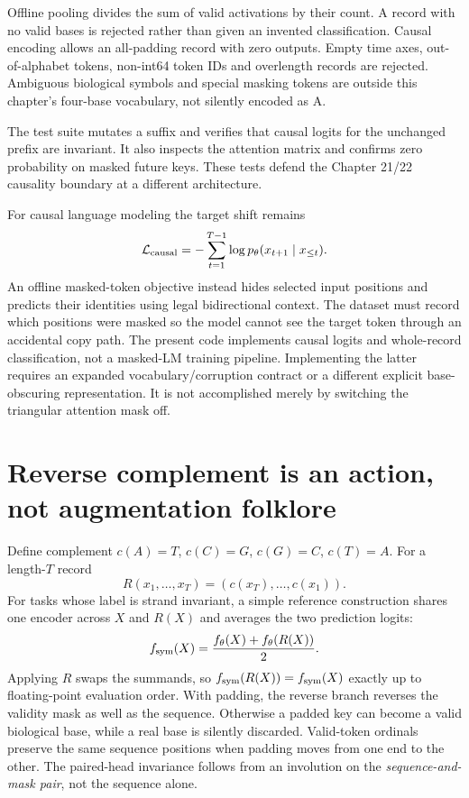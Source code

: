 Offline pooling divides the sum of valid activations by their count. A record
with no valid bases is rejected rather than given an invented classification.
Causal encoding allows an all-padding record with zero outputs. Empty time
axes, out-of-alphabet tokens, non-int64 token IDs and overlength records are
rejected. Ambiguous biological symbols and special masking tokens are outside
this chapter's four-base vocabulary, not silently encoded as A.


The test suite mutates a suffix and verifies that causal logits for the unchanged
prefix are invariant. It also inspects the attention matrix and confirms zero
probability on masked future keys. These tests defend the Chapter 21/22 causality
boundary at a different architecture.

For causal language modeling the target shift remains
\[
\mathcal L_{\rm causal}
=-\sum_{t=1}^{T-1}\log p_\theta(x_{t+1}\mid x_{\le t}).
\]
An offline masked-token objective instead hides selected input positions and predicts
their identities using legal bidirectional context. The dataset must record which
positions were masked so the model cannot see the target token through an accidental
copy path.
The present code implements causal logits and whole-record classification, not a
masked-LM training pipeline. Implementing the latter requires an expanded
vocabulary/corruption contract or a different explicit base-obscuring representation.
It is not accomplished merely by switching the triangular attention mask off.

\section{Reverse complement is an action, not augmentation folklore}

Define complement $c(A)=T$, $c(C)=G$, $c(G)=C$, $c(T)=A$. For a length-$T$ record
\[
R(x_1,\ldots,x_T)=(c(x_T),\ldots,c(x_1)).
\]
For tasks whose label is strand invariant, a simple reference construction shares
one encoder across $X$ and $R(X)$ and averages the two prediction logits:
\[
f_{\rm sym}(X)={f_\theta(X)+f_\theta(R(X))\over2}.
\label{evod23:rc}
\]
Applying $R$ swaps the summands, so $f_{\rm sym}(R(X))=f_{\rm sym}(X)$ exactly up
to floating-point evaluation order.
With padding, the reverse branch reverses the validity mask as well as the sequence.
Otherwise a padded key can become a valid biological base, while a real base is
silently discarded. Valid-token ordinals preserve the same sequence positions when
padding moves from one end to the other. The paired-head invariance follows from
an involution on the \emph{sequence-and-mask pair}, not the sequence alone.

